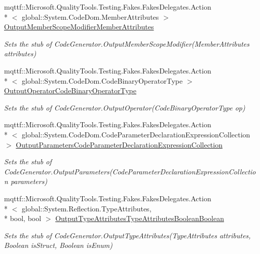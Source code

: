 \begin{DoxyCompactItemize}
mqttf\-::\-Microsoft.\-Quality\-Tools.\-Testing.\-Fakes.\-Fakes\-Delegates.\-Action\\*
$<$ global\-::\-System.\-Code\-Dom.\-Member\-Attributes $>$ \hyperlink{class_system_1_1_code_dom_1_1_compiler_1_1_fakes_1_1_stub_code_compiler_a999f3cb1ac596175f262deb55a795fa0}{Output\-Member\-Scope\-Modifier\-Member\-Attributes}
\begin{DoxyCompactList}\small\item\em Sets the stub of Code\-Generator.\-Output\-Member\-Scope\-Modifier(\-Member\-Attributes attributes)\end{DoxyCompactList}\item 
mqttf\-::\-Microsoft.\-Quality\-Tools.\-Testing.\-Fakes.\-Fakes\-Delegates.\-Action\\*
$<$ global\-::\-System.\-Code\-Dom.\-Code\-Binary\-Operator\-Type $>$ \hyperlink{class_system_1_1_code_dom_1_1_compiler_1_1_fakes_1_1_stub_code_compiler_a907995b38814ecfface3f12f28f2ed80}{Output\-Operator\-Code\-Binary\-Operator\-Type}
\begin{DoxyCompactList}\small\item\em Sets the stub of Code\-Generator.\-Output\-Operator(\-Code\-Binary\-Operator\-Type op)\end{DoxyCompactList}\item 
mqttf\-::\-Microsoft.\-Quality\-Tools.\-Testing.\-Fakes.\-Fakes\-Delegates.\-Action\\*
$<$ global\-::\-System.\-Code\-Dom.\-Code\-Parameter\-Declaration\-Expression\-Collection $>$ \hyperlink{class_system_1_1_code_dom_1_1_compiler_1_1_fakes_1_1_stub_code_compiler_afe740bb98422748abd09c08a7d42109e}{Output\-Parameters\-Code\-Parameter\-Declaration\-Expression\-Collection}
\begin{DoxyCompactList}\small\item\em Sets the stub of Code\-Generator.\-Output\-Parameters(\-Code\-Parameter\-Declaration\-Expression\-Collection parameters)\end{DoxyCompactList}\item 
mqttf\-::\-Microsoft.\-Quality\-Tools.\-Testing.\-Fakes.\-Fakes\-Delegates.\-Action\\*
$<$ global\-::\-System.\-Reflection.\-Type\-Attributes, \\*
bool, bool $>$ \hyperlink{class_system_1_1_code_dom_1_1_compiler_1_1_fakes_1_1_stub_code_compiler_a46f8871806f72540a263b0c2054b5647}{Output\-Type\-Attributes\-Type\-Attributes\-Boolean\-Boolean}
\begin{DoxyCompactList}\small\item\em Sets the stub of Code\-Generator.\-Output\-Type\-Attributes(\-Type\-Attributes attributes, Boolean is\-Struct, Boolean is\-Enum)\end{DoxyCompactList}\item 

\end{DoxyCompactItemize}
